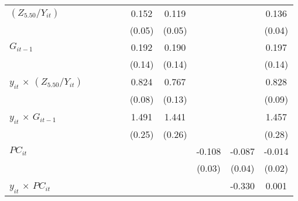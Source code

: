 \documentclass[12pt, a4paper]{article}
\begin{document}
\begin{table}[htbp]
\begin{threeparttable}
{\begin{tabular}{l*{9}{c}}
				$(Z_{5.50}/Y_{it})$          &                     &                     &                     &                     &       0.152\sym{**} &       0.119\sym{*}  &                     &                     &       0.136\sym{**} \\
				&                     &                     &                     &                     &      (0.05)         &      (0.05)         &                     &                     &      (0.04)         \\
				$G_{it-1}$            &                     &                     &                     &                     &       0.192         &       0.190         &                     &                     &       0.197         \\
				&                     &                     &                     &                     &      (0.14)         &      (0.14)         &                     &                     &      (0.14)         \\
				$y_{it}$ $\times$ $(Z_{5.50}/Y_{it})$&                     &                     &                     &                     &       0.824\sym{***}&       0.767\sym{***}&                     &                     &       0.828\sym{***}\\
				&                     &                     &                     &                     &      (0.08)         &      (0.13)         &                     &                     &      (0.09)         \\
				$y_{it}$ $\times$ $G_{it-1}$&                     &                     &                     &                     &       1.491\sym{***}&       1.441\sym{***}&                     &                     &       1.457\sym{***}\\
				&                     &                     &                     &                     &      (0.25)         &      (0.26)         &                     &                     &      (0.28)         \\
				$PC_{it}$                &                     &                     &                     &                     &                     &                     &      -0.108\sym{**} &      -0.087\sym{*}  &      -0.014         \\
				&                     &                     &                     &                     &                     &                     &      (0.03)         &      (0.04)         &      (0.02)         \\
				$y_{it}$ $\times$ $PC_{it}$ &                     &                     &                     &                     &                     &                     &                     &      -0.330\sym{*}  &       0.001         \\

\end{tabular}}
\end{threeparttable}
\end{table}
\end{document}

